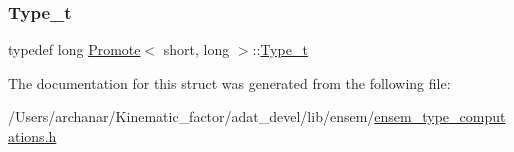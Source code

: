 \subsubsection{\texorpdfstring{Type\_t}{Type\_t}\hspace{0.1cm}{\footnotesize\ttfamily [2/2]}}
{\footnotesize\ttfamily typedef long \mbox{\hyperlink{structPromote}{Promote}}$<$ short, long $>$\+::\mbox{\hyperlink{structPromote_3_01short_00_01long_01_4_a46884a4f8850dbebc27c57717668957b}{Type\+\_\+t}}}



The documentation for this struct was generated from the following file\+:\begin{DoxyCompactItemize}
\item 
/\+Users/archanar/\+Kinematic\+\_\+factor/adat\+\_\+devel/lib/ensem/\mbox{\hyperlink{lib_2ensem_2ensem__type__computations_8h}{ensem\+\_\+type\+\_\+computations.\+h}}\end{DoxyCompactItemize}
